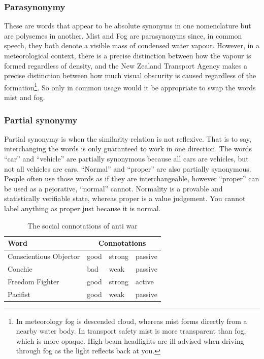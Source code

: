 \subsubsection{Parasynonymy}
These are words that appear to be absolute synonyms in one nomenclature but are polysemes in another. Mist and Fog are parasynonyms since, in common speech, they both denote a visible mass of condensed water vapour. However, in a meteorological context, there is a precise distinction between how the vapour is formed regardless of density, and the New Zealand Transport Agency makes a precise distinction between how much visual obscurity is caused regardless of the formation\footnote{In meteorology fog is descended cloud, whereas mist forms directly from a nearby water body. In transport safety mist is more transparent than fog, which is more opaque. High-beam headlights are ill-advised when driving through fog as the light reflects back at you.}. So only in common usage would it be appropriate to swap the words mist and fog.

\subsubsection{Partial synonymy}
Partial synonymy is when the similarity relation is not reflexive. That is to say, interchanging the words is only guaranteed to work in one direction. The words ``car'' and ``vehicle'' are partially synonymous because all cars are vehicles, but not all vehicles are cars.  ``Normal'' and ``proper'' are also partially synonymous. People often use those words as if they are interchangeable, however ``proper'' can be used as a pejorative, ``normal'' cannot. Normality is a provable and statistically verifiable state, whereas proper is a value judgement. You cannot label anything as proper just because it is normal.

\begin{table}[h]
    \begin{center}
        \begin{tabular}{|l|lll|}
        \hline
        \textbf{Word} & \multicolumn{3}{c|}{\textbf{Connotations}} \\ \hline
        Conscientious Objector & good & strong & passive \\
        Conchie                & bad  & weak   & passive \\
        Freedom Fighter        & good & strong & active  \\
        Pacifist               & good & weak   & passive \\ \hline
        \end{tabular}
    \end{center}
    \caption{The social connotations of anti war}
    \label{tab:psycholinguistic-connotation}
\end{table}

